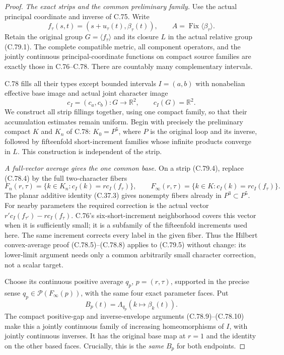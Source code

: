 \begin{proof}
\emph{The exact strips and the common preliminary family.}
Use the actual principal coordinate and inverse
of C.75. Write
\[
        f_\tau(s,t)=(s+u_\tau(t),\beta_\tau(t)),
        \qquad A=\operatorname{Fix}\langle\beta_\tau\rangle.
                                                               \tag{C.79.3}
\]
Retain the original group $G=\langle f_\tau\rangle$
and its closure $L$ in the actual relative group
(C.79.1). The complete compatible metric, all
component operators, and the jointly continuous
principal-coordinate functions on compact source
families are exactly those in C.76--C.78.
There are countably many complementary intervals.

C.78 fills all their types except bounded intervals
$I=(a,b)$ with nonabelian effective base image and
actual joint character image
\[
                  c_I=(c_a,c_b):G\longrightarrow\mathbb R^2,
                  \qquad c_I(G)=\mathbb R^2.
                                                               \tag{C.79.4}
\]
We construct all strip fillings together, using
one compact family, so that their accumulation
estimates remain uniform. Begin with precisely
the preliminary compact $K$ and $K_n$ of C.78:
$K_0=P^5$, where $P$ is the original loop and its
inverse, followed by fifteenfold short-increment
families whose infinite products converge in $L$.
This construction is independent of the strip.

\emph{A full-vector average gives the one common base.}
On a strip (C.79.4), replace (C.78.4) by the
full two-character fibers
\[
       F_n(r,\tau)=
          \{k\in K_n:c_I(k)=r c_I(f_\tau)\},
       \qquad
       F_\infty(r,\tau)=
          \{k\in K:c_I(k)=r c_I(f_\tau)\}.
                                                               \tag{C.79.5}
\]
The planar additive identity (C.37.3) gives
nonempty fibers already in $P^3\subset P^5$.
For nearby parameters the required correction
is the actual vector
$r'c_I(f_{\tau'})-r c_I(f_\tau)$.
C.76's six-short-increment neighborhood covers
this vector when it is sufficiently small; it
is a subfamily of the fifteenfold increments
used here. The same increment corrects every
label in the given fiber. Thus the Hilbert
convex-average proof (C.78.5)--(C.78.8) applies
to (C.79.5) without change: its lower-limit
argument needs only a common arbitrarily small
character correction, not a scalar target.

Choose its continuous positive average $q_p$,
$p=(r,\tau)$, supported in the precise sense
$q_p\in\mathcal P(F_\infty(p))$, with the same
four exact parameter faces. Put
\[
               B_p(t)=\Lambda_{q_p}(k\mapsto\beta_k(t)).
                                                               \tag{C.79.6}
\]
The compact positive-gap and inverse-envelope
arguments (C.78.9)--(C.78.10) make this a jointly
continuous family of increasing homeomorphisms
of $I$, with jointly continuous inverses.
It has the original base map at $r=1$ and the
identity on the other based faces. Crucially,
this is the \emph{same} $B_p$ for both endpoints.


\end{proof}
